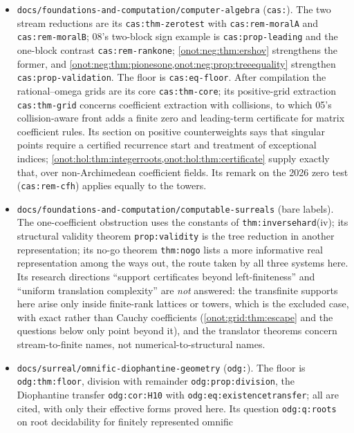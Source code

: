 \documentclass[11pt,oneside]{article}
\numberwithin{equation}{section}
\theoremstyle{definition}
\theoremstyle{remark}
\newcommand{\replabel}[1]{\nolinkurl{#1}}
\newcommand{\fn}[1]{\nolinkurl{#1}}
\begin{document}
\begin{itemize}[leftmargin=*]
\item \fn{docs/foundations-and-computation/computer-algebra} (\texttt{cas:}). The
two stream reductions are its \replabel{cas:thm-zerotest} with
\replabel{cas:rem-moralA} and \replabel{cas:rem-moralB}; 08's two-block sign
example is \replabel{cas:prop-leading} and the one-block contrast
\replabel{cas:rem-rankone}; \cref{onot:neg:thm:ershov} strengthens the former, and
\cref{onot:neg:thm:pionesone,onot:neg:prop:treeequality} strengthen
\replabel{cas:prop-validation}. The floor is \replabel{cas:eq-floor}. After
compilation the rational--omega grids are its core \replabel{cas:thm-core}; its
positive-grid extraction \replabel{cas:thm-grid} concerns coefficient extraction
with collisions, to which 05's collision-aware front adds a finite zero and
leading-term certificate for matrix coefficient rules. Its section on positive
counterweights says that singular points require a certified recurrence start and
treatment of exceptional indices; \cref{onot:hol:thm:integerroots,onot:hol:thm:certificate}
supply exactly that, over non-Archimedean coefficient fields. Its remark on the
2026 zero test (\replabel{cas:rem-cfh}) applies equally to the towers.
\item \fn{docs/foundations-and-computation/computable-surreals} (bare labels). The
one-coefficient obstruction uses the constants of \replabel{thm:inversehard}(iv);
its structural validity theorem \replabel{prop:validity} is the tree reduction in
another representation; its no-go theorem \replabel{thm:nogo} lists a more
informative real representation among the ways out, the route taken by all three
systems here. Its research directions ``support certificates beyond
left-finiteness'' and ``uniform translation complexity'' are \emph{not} answered:
the transfinite supports here arise only inside finite-rank lattices or towers,
which is the excluded case, with exact rather than Cauchy coefficients
(\cref{onot:grid:thm:escape} and the questions below only point beyond it), and
the translator theorems concern stream-to-finite names, not numerical-to-structural
names.
\item \fn{docs/surreal/omnific-diophantine-geometry} (\texttt{odg:}). The floor is
\replabel{odg:thm:floor}, division with remainder \replabel{odg:prop:division}, the
Diophantine transfer \replabel{odg:cor:H10} with \replabel{odg:eq:existencetransfer};
all are cited, with only their effective forms proved here. Its question
\replabel{odg:q:roots} on root decidability for finitely represented omnific

\end{itemize}
\end{document}
